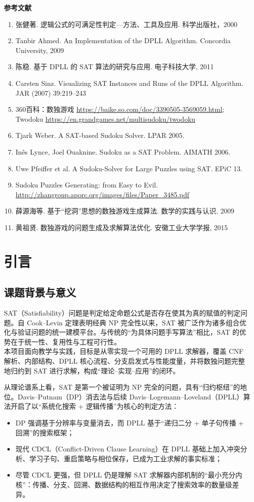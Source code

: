\documentclass[UTF8]{ctexart}
\begin{document}
\noindent
\textbf{参考文献}
\begin{enumerate}
  \item 张健著. 逻辑公式的可满足性判定—方法、工具及应用. 科学出版社，2000
  \item Tanbir Ahmed. An Implementation of the DPLL Algorithm. Concordia University, 2009
  \item 陈稳. 基于 DPLL 的 SAT 算法的研究与应用. 电子科技大学, 2011
  \item Carsten Sinz. Visualizing SAT Instances and Runs of the DPLL Algorithm. JAR (2007) 39:219–243
  \item 360百科：数独游戏 \url{https://baike.so.com/doc/3390505-3569059.html}; Twodoku \url{https://en.grandgames.net/multisudoku/twodoku}
  \item Tjark Weber. A SAT-based Sudoku Solver. LPAR 2005.
  \item In\^es Lynce, Joel Ouaknine. Sudoku as a SAT Problem. AIMATH 2006.
  \item Uwe Pfeiffer et al. A Sudoku-Solver for Large Puzzles using SAT. EPiC 13.
  \item Sudoku Puzzles Generating: from Easy to Evil. \url{http://zhangroup.aporc.org/images/files/Paper_3485.pdf}
  \item 薛源海等. 基于“挖洞”思想的数独游戏生成算法. 数学的实践与认识, 2009
  \item 黄祖贤. 数独游戏的问题生成及求解算法优化. 安徽工业大学学报, 2015
\end{enumerate}

\section{引言}
\subsection{课题背景与意义}
SAT（Satisfiability）问题是判定给定命题公式是否存在使其为真的赋值的判定问题。自 Cook--Levin 定理表明经典 NP 完全性以来，SAT 被广泛作为诸多组合优化与验证问题的统一建模平台。与传统的“为具体问题手写算法”相比，SAT 的优势在于统一性、复用性与工程可行性。\\
本项目面向教学与实践，目标是从零实现一个可用的 DPLL 求解器，覆盖 CNF 解析、内部结构、DPLL 核心流程、分支启发式与性能度量，并将数独问题完整地归约到 SAT 进行求解，构成“理论--实现--应用”的闭环。

从理论谱系上看，SAT 是第一个被证明为 NP 完全的问题，具有“归约枢纽”的地位。Davis--Putnam（DP）消去法与后续 Davis--Logemann--Loveland（DPLL）算法开启了以“系统化搜索 + 逻辑传播”为核心的判定方法：
\begin{itemize}
  \item DP 强调基于分辨率与变量消去，而 DPLL 基于“递归二分 + 单子句传播 + 回溯”的搜索框架；
  \item 现代 CDCL（Conflict-Driven Clause Learning）在 DPLL 基础上加入冲突分析、学习子句、重启策略与相位保存，已成为工业求解的事实标准；
  \item 尽管 CDCL 更强，但 DPLL 仍是理解 SAT 求解器内部机制的“最小充分内核”：传播、分支、回溯、数据结构的相互作用决定了搜索效率的数量级差异。
\end{itemize}
\end{document}
